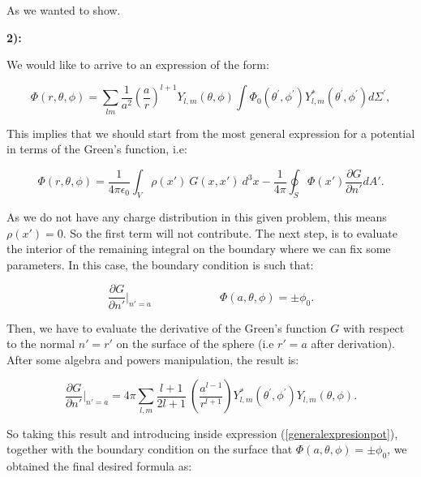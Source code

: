 As we wanted to show.
	
	
\textbf{2):}
	
We would like to arrive to an expression of the form:

\begin{equation}
	\Phi(r, \theta, \phi)=\sum_{l m}\frac{1}{a^{2}}\left(\frac{a}{r}\right)^{l+1} Y_{l, m}(\theta, \phi) \int \Phi_{0}\left(\theta^{\prime}, \phi^{\prime}\right) Y_{l, m}^{*}\left(\theta^{\prime}, \phi^{\prime}\right) d \Sigma^{\prime},
\end{equation}

This implies that we should start from the most general expression for a potential in terms of the Green's function, i.e:

\begin{equation}\label{generalexpresionpot}
	\Phi(r,\theta, \phi) = \frac{1}{4 \pi \epsilon_{0}} \int_{V} \rho(x')\: G(x,x') \:d^{3} x - \frac{1}{4 \pi} \oint_{S} \Phi(x') \frac{\partial G}{\partial n'} d A' .
\end{equation}

As we do not have any charge distribution in this given problem, this means $\rho(x') =0$. So the first term will not contribute. The next step, is to evaluate the interior of the remaining integral on the boundary where we can fix some parameters. In this case, the boundary condition is such that:
	
\begin{equation}
	\frac{\partial G}{\partial n'}\biggr\rvert_{n' =a}\qquad \qquad \qquad \Phi(a, \theta, \phi) = \pm \phi_{0}.
\end{equation}

Then, we have to evaluate the derivative of the Green's function $G$ with respect to the normal $n' = r'$ on the surface of the sphere (i.e $r'=a$ after derivation). After some algebra and powers manipulation, the result is:
	
\begin{equation}
	\frac{\partial G}{\partial n'}\biggr\rvert_{n' =a}=4 \pi \sum_{l, m} \frac{l+1}{2 l+1}\:\left(\frac{a^{l-1}}{r^{l+1}}\right) Y_{l, m}^{*}\left(\theta^{\prime}, \phi^{\prime}\right) Y_{l, m}(\theta, \phi).
\end{equation}

So taking this result and introducing inside expression (\ref{generalexpresionpot}), together with the boundary condition on the surface that $\Phi(a, \theta, \phi) = \pm \phi_{0}$, we obtained the final desired formula as:
	
